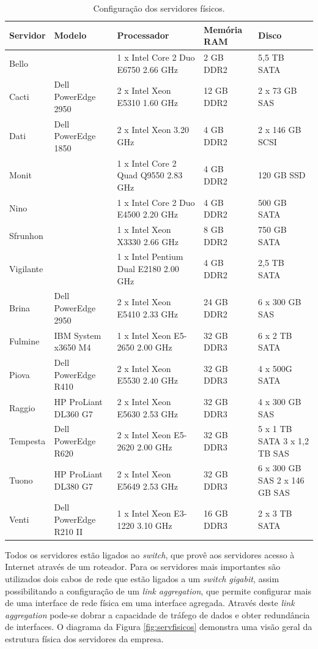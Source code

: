 \begin{table}[h!]
\caption{Configuração dos servidores físicos.}
\label{tab:servfisicos}
\begin{center}
\def\arraystretch{1}
\setlength{\tabcolsep}{0.15cm}
\begin{tabular}{|l|l|p{5.1cm}|l|p{2.1cm}|}\hline
Servidor & Modelo & Processador & Memória RAM & Disco\\\hline
Bello & & 1 x Intel Core 2 Duo E6750 2.66 GHz & 2 GB DDR2 & 5,5 TB SATA\\\hline
Cacti & Dell PowerEdge 2950 & 2 x Intel Xeon E5310 1.60 GHz & 12 GB DDR2 & 2 x 73 GB SAS\\\hline
Dati & Dell PowerEdge 1850 & 2 x Intel Xeon 3.20 GHz & 4 GB DDR2 & 2 x 146 GB SCSI\\\hline
Monit & & 1 x Intel Core 2 Quad Q9550 2.83 GHz & 4 GB DDR2 & 120 GB SSD\\\hline
Nino & & 1 x Intel Core 2 Duo E4500 2.20 GHz & 4 GB DDR2 & 500 GB SATA\\\hline
Sfrunhon & & 1 x Intel Xeon X3330 2.66 GHz & 8 GB DDR2 & 750 GB SATA\\\hline
Vigilante & & 1 x Intel Pentium Dual E2180 2.00 GHz & 4 GB DDR2 & 2,5 TB SATA\\\hline
Brina & Dell PowerEdge 2950 & 2 x Intel Xeon E5410 2.33 GHz & 24 GB DDR2 & 6 x 300 GB SAS\\\hline
Fulmine & IBM System x3650 M4 & 1 x Intel Xeon E5-2650 2.00 GHz & 32 GB DDR3 & 6 x 2 TB SATA\\\hline
Piova & Dell PowerEdge R410 & 2 x Intel Xeon E5530 2.40 GHz & 32 GB DDR3 & 4 x 500G SATA\\\hline
Raggio & HP ProLiant DL360 G7 & 2 x  Intel Xeon E5630 2.53 GHz & 32 GB DDR3 & 4 x 300 GB SAS\\\hline
Tempesta & Dell PowerEdge R620 & 2 x Intel Xeon E5-2620 2.00 GHz & 32 GB DDR3 & 5 x 1 TB SATA 3 x 1,2 TB SAS\\\hline
Tuono & HP ProLiant DL380 G7 & 2 x Intel Xeon E5649 2.53 GHz & 32 GB DDR3 & 6 x 300 GB SAS 2 x 146 GB SAS\\\hline
Venti & Dell PowerEdge R210 II & 1 x Intel Xeon E3-1220 3.10 GHz & 16 GB DDR3 & 2 x 3 TB SATA\\\hline
\end{tabular}
\end{center}
\end{table}

Todos os servidores estão ligados ao \textit{switch}, que provê aos servidores acesso à Internet através de um roteador. Para os servidores 
mais importantes são utilizados dois cabos de rede que estão ligados a um \textit{switch} \textit{gigabit}, assim possibilitando a configuração 
de um \textit{link aggregation}, que permite configurar mais de uma interface de rede física em uma interface agregada. Através deste 
\textit{link aggregation} pode-se dobrar a capacidade de tráfego de dados e obter redundância de interfaces. 
O diagrama da Figura \ref{fig:servfisicos} demonstra uma visão geral da estrutura física dos servidores da empresa. 

